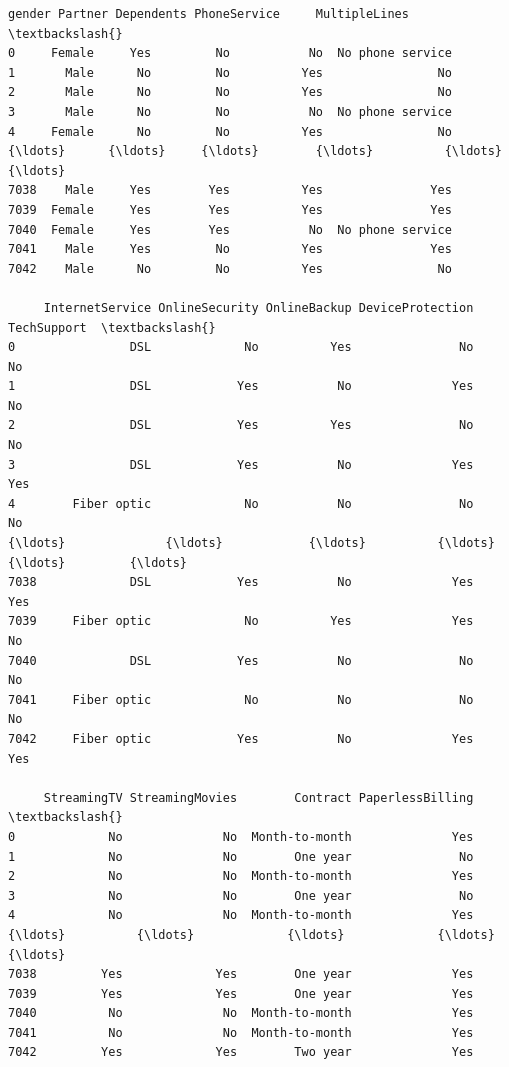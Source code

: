 \documentclass[11pt]{article}
\makeatletter
\newcommand{\boxspacing}{\kern\kvtcb@left@rule\kern\kvtcb@boxsep}
\newcommand{\prompt}[4]{
        {\ttfamily\llap{{\color{#2}[#3]:\hspace{3pt}#4}}\vspace{-\baselineskip}}
    }
\makeatother
\begin{document}
            \begin{tcolorbox}[breakable, size=fbox, boxrule=.5pt, pad at break*=1mm, opacityfill=0]
\prompt{Out}{outcolor}{248}{\boxspacing}
\begin{Verbatim}[commandchars=\\\{\}]
      gender Partner Dependents PhoneService     MultipleLines  \textbackslash{}
0     Female     Yes         No           No  No phone service
1       Male      No         No          Yes                No
2       Male      No         No          Yes                No
3       Male      No         No           No  No phone service
4     Female      No         No          Yes                No
{\ldots}      {\ldots}     {\ldots}        {\ldots}          {\ldots}               {\ldots}
7038    Male     Yes        Yes          Yes               Yes
7039  Female     Yes        Yes          Yes               Yes
7040  Female     Yes        Yes           No  No phone service
7041    Male     Yes         No          Yes               Yes
7042    Male      No         No          Yes                No

     InternetService OnlineSecurity OnlineBackup DeviceProtection TechSupport  \textbackslash{}
0                DSL             No          Yes               No          No
1                DSL            Yes           No              Yes          No
2                DSL            Yes          Yes               No          No
3                DSL            Yes           No              Yes         Yes
4        Fiber optic             No           No               No          No
{\ldots}              {\ldots}            {\ldots}          {\ldots}              {\ldots}         {\ldots}
7038             DSL            Yes           No              Yes         Yes
7039     Fiber optic             No          Yes              Yes          No
7040             DSL            Yes           No               No          No
7041     Fiber optic             No           No               No          No
7042     Fiber optic            Yes           No              Yes         Yes

     StreamingTV StreamingMovies        Contract PaperlessBilling  \textbackslash{}
0             No              No  Month-to-month              Yes
1             No              No        One year               No
2             No              No  Month-to-month              Yes
3             No              No        One year               No
4             No              No  Month-to-month              Yes
{\ldots}          {\ldots}             {\ldots}             {\ldots}              {\ldots}
7038         Yes             Yes        One year              Yes
7039         Yes             Yes        One year              Yes
7040          No              No  Month-to-month              Yes
7041          No              No  Month-to-month              Yes
7042         Yes             Yes        Two year              Yes


\end{Verbatim}
\end{tcolorbox}
\end{document}
